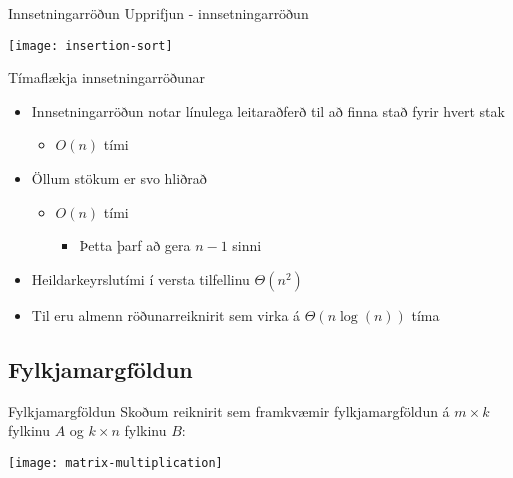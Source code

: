 \documentclass[handout]{beamer}
\begin{document}
\begin{frame}{Innsetningarröðun}
Upprifjun - innsetningarröðun
\begin{center}
\texttt{[image: insertion-sort]}
\end{center}
\end{frame}

\begin{frame}{Tímaflækja innsetningarröðunar}
    \begin{itemize}
        \item Innsetningarröðun notar línulega leitaraðferð til að finna stað fyrir hvert stak \pause
        \begin{itemize}
            \item $O(n)$ tími
        \end{itemize}
            \item Öllum stökum er svo hliðrað \pause
            \begin{itemize}
                \item $O(n)$ tími
                \begin{itemize}
                    \item Þetta þarf að gera $n-1$ sinni
                \end{itemize}
            \end{itemize}
        \item Heildarkeyrslutími í versta tilfellinu $\Theta(n^2)$
        \item Til eru almenn röðunarreiknirit sem virka á $\Theta(n\log(n))$ tíma
    \end{itemize}
\end{frame}

\subsection{Fylkjamargföldun}

\begin{frame}{Fylkjamargföldun}
    \vspace{0.5cm}
    Skoðum reiknirit sem framkvæmir fylkjamargföldun á $m \times k$ fylkinu $A$ og $k \times n$ fylkinu $B$:
    \begin{center}
        \texttt{[image: matrix-multiplication]}
    \end{center}
\end{frame}
\end{document}
